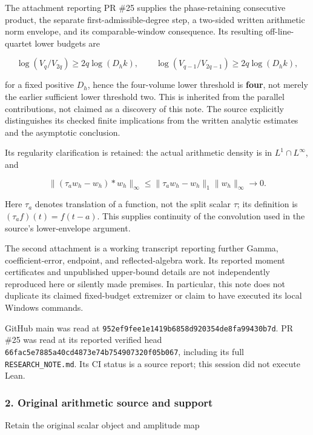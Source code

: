 The attachment reporting PR \#25 supplies the phase-retaining consecutive product, the separate first-admissible-degree step, a two-sided written arithmetic norm envelope, and its comparable-window consequence. Its resulting off-line-quartet lower budgets are

\[
 \log(V_q/V_{2q})\ge2q\log(D_hk),\qquad
 \log(V_{q-1}/V_{2q-1})\ge2q\log(D_hk),                         \tag{2}
\]

for a fixed positive \(D_h\), hence the four-volume lower threshold is \textbf{four}, not merely the earlier sufficient lower threshold two. This is inherited from the parallel contributions, not claimed as a discovery of this note. The source explicitly distinguishes its checked finite implications from the written analytic estimates and the asymptotic conclusion.

Its regularity clarification is retained: the actual arithmetic density is in \(L^1\cap L^\infty\), and

\[
 \|(\tau_aw_h-w_h)*w_h\|_\infty
 \le\|\tau_aw_h-w_h\|_1\|w_h\|_\infty\longrightarrow0.
\]

Here \(\tau_a\) denotes translation of a function, not the split scalar \(\tau\); its definition is \((\tau_af)(t)=f(t-a)\). This supplies continuity of the convolution used in the source's lower-envelope argument.

The second attachment is a working transcript reporting further Gamma, coefficient-error, endpoint, and reflected-algebra work. Its reported moment certificates and unpublished upper-bound details are not independently reproduced here or silently made premises. In particular, this note does not duplicate its claimed fixed-budget extremizer or claim to have executed its local Windows commands.

GitHub main was read at \nolinkurl{952ef9fee1e1419b6858d920354de8fa99430b7d}. PR \#25 was read at its reported verified head \nolinkurl{66fac5e7885a40cd4873e74b754907320f05b067}, including its full \nolinkurl{RESEARCH_NOTE.md}. Its CI status is a source report; this session did not execute Lean.

\subsubsection{2. Original arithmetic source and support}\label{endpoint-relation_moment_original--original-arithmetic-source-and-support}

Retain the original scalar object and amplitude map

